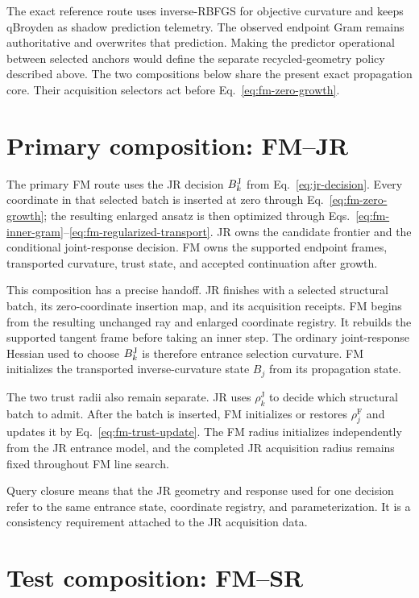 \documentclass[10pt,twocolumn]{article}
\begin{document}
The exact reference route uses inverse-RBFGS for objective curvature and keeps
qBroyden as shadow prediction telemetry. The observed endpoint
Gram remains authoritative and overwrites that prediction. Making the
predictor operational between selected anchors would define the separate
recycled-geometry policy described above. The two compositions below share
the present exact propagation core. Their acquisition selectors act before
Eq.~\eqref{eq:fm-zero-growth}.

\section*{Primary composition: FM--JR}

The primary FM route uses the JR decision
\(B_k^{\rm J}\) from Eq.~\eqref{eq:jr-decision}. Every coordinate in that
selected batch is inserted at zero through Eq.~\eqref{eq:fm-zero-growth}; the
resulting enlarged ansatz is then optimized through
Eqs.~\eqref{eq:fm-inner-gram}--\eqref{eq:fm-regularized-transport}. JR owns
the candidate frontier and the conditional joint-response decision. FM owns
the supported endpoint frames, transported curvature, trust state, and
accepted continuation after growth.

This composition has a precise handoff. JR finishes with a selected structural
batch, its zero-coordinate insertion map, and its acquisition receipts. FM
begins from the resulting unchanged ray and enlarged coordinate registry. It
rebuilds the supported tangent frame before taking an inner step. The ordinary
joint-response Hessian used to choose \(B_k^{\rm J}\) is therefore entrance
selection curvature. FM initializes the transported inverse-curvature state
\(B_j\) from its propagation state.

The two trust radii also remain separate. JR uses
\(\rho_k^{\mathrm J}\) to decide which structural batch to admit. After
the batch is inserted, FM initializes or restores \(\rho_j^{\mathrm F}\) and
updates it by Eq.~\eqref{eq:fm-trust-update}. The FM radius initializes
independently from the JR entrance model, and the completed JR acquisition
radius remains fixed throughout FM line search.

Query closure means that the JR geometry and response used for one decision
refer to the same entrance state, coordinate registry, and parameterization.
It is a consistency requirement attached to the JR acquisition data.

\section*{Test composition: FM--SR}
\end{document}
